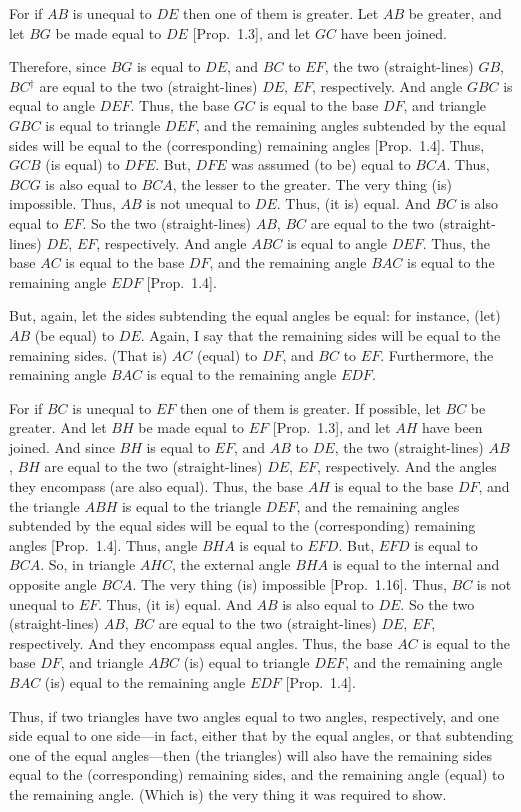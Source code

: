 \begin{Parallel}{}{}
{\epsfysize=1.5in
\centerline{}

For if $AB$ is unequal to $DE$ then one of them is greater. Let $AB$ be greater,
and let $BG$ be made equal to $DE$ [Prop.~1.3], and let $GC$ have been
joined.

Therefore, since $BG$ is equal to $DE$, and $BC$ to $EF$, the two (straight-lines)
$GB$, $BC$$^\dag$ are equal to the two (straight-lines) $DE$, $EF$, respectively. And angle
$GBC$ is equal to angle $DEF$. Thus, the base $GC$ is equal to the base $DF$,
and triangle $GBC$ is equal to triangle $DEF$, and the remaining angles 
subtended by the equal sides will
be equal to the (corresponding) remaining angles [Prop.~1.4].
Thus, $GCB$ (is equal) to $DFE$. But,  $DFE$ was assumed (to be) equal to $BCA$.
Thus, $BCG$ is also equal to $BCA$, the lesser to the greater. The very thing (is) impossible. Thus, $AB$ is not unequal to $DE$. Thus, (it is) equal. And $BC$ is
also equal to $EF$. So the two (straight-lines) $AB$, $BC$ are equal to the two (straight-lines) $DE$, $EF$, respectively. And angle $ABC$ is equal to
angle $DEF$. Thus, the base $AC$ is equal to the base $DF$, and the remaining
angle $BAC$ is equal to the remaining angle $EDF$ [Prop.~1.4].

But, again, let the sides subtending the equal angles be equal: for instance, 
(let) $AB$ (be equal) to
$DE$.  Again, I say that the remaining sides will be equal to the remaining
sides. (That is) $AC$ (equal) to $DF$, and $BC$ to $EF$. Furthermore, the remaining angle
$BAC$ is equal to the remaining angle $EDF$.

For if $BC$ is unequal to $EF$ then one of them is greater. If possible, let $BC$
be greater. And let $BH$ be made equal to $EF$ [Prop.~1.3], and let $AH$ have been joined.
And since $BH$ is equal to $EF$, and $AB$ to $DE$, the two (straight-lines) $AB$, $BH$
are equal to the two (straight-lines) $DE$, $EF$, respectively. And the angles
they encompass (are also equal). Thus, the base $AH$ is equal to the base  
$DF$, and the triangle $ABH$ is equal to the triangle $DEF$, and the
remaining angles subtended by the equal sides will be equal to the
(corresponding) remaining angles [Prop.~1.4]. Thus, angle $BHA$ 
is equal to $EFD$. But, $EFD$ is equal to $BCA$. So, in triangle $AHC$,
the external angle $BHA$ is equal to the internal and opposite angle 
$BCA$. The very thing (is) impossible [Prop.~1.16]. Thus, $BC$ is not unequal to $EF$.
Thus, (it is) equal. And $AB$ is also equal to $DE$. So the two
(straight-lines) $AB$, $BC$ are equal to the two (straight-lines) $DE$, $EF$,
respectively. And they encompass equal angles. Thus, the base $AC$ is equal
to the base $DF$, and triangle $ABC$ (is) equal to triangle $DEF$, and the
remaining angle $BAC$ (is) equal to the remaining angle $EDF$ [Prop.~1.4].

Thus, if two triangles have two angles equal to two angles, respectively, 
and one side equal to one side---in fact, either that by the equal angles, or that
subtending one of the equal angles---then (the triangles) will also have the remaining sides equal to the (corresponding) remaining sides, and the
remaining angle (equal) to the remaining angle. (Which is) the very thing it
was required to show.}
\end{Parallel}
